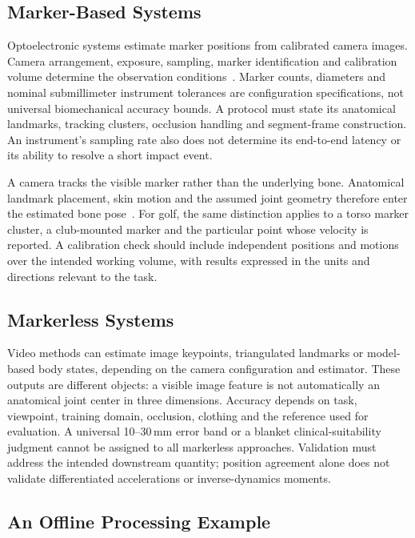\subsection{Marker-Based Systems}

Optoelectronic systems estimate marker positions from calibrated camera images.
Camera arrangement, exposure, sampling, marker identification and calibration volume determine the observation conditions~\cite{chiari2005human}.
Marker counts, diameters and nominal submillimeter instrument tolerances are configuration specifications, not universal biomechanical accuracy bounds.
A protocol must state its anatomical landmarks, tracking clusters, occlusion handling and segment-frame construction.
An instrument's sampling rate also does not determine its end-to-end latency or its ability to resolve a short impact event.

A camera tracks the visible marker rather than the underlying bone.
Anatomical landmark placement, skin motion and the assumed joint geometry therefore enter the estimated bone pose~\cite{leardini2005human}.
For golf, the same distinction applies to a torso marker cluster, a club-mounted marker and the particular point whose velocity is reported.
A calibration check should include independent positions and motions over the intended working volume, with results expressed in the units and directions relevant to the task.

\subsection{Markerless Systems}

Video methods can estimate image keypoints, triangulated landmarks or model-based body states, depending on the camera configuration and estimator.
These outputs are different objects: a visible image feature is not automatically an anatomical joint center in three dimensions.
Accuracy depends on task, viewpoint, training domain, occlusion, clothing and the reference used for evaluation.
A universal 10--30\,mm error band or a blanket clinical-suitability judgment cannot be assigned to all markerless approaches.
Validation must address the intended downstream quantity; position agreement alone does not validate differentiated accelerations or inverse-dynamics moments.

\subsection{An Offline Processing Example}

